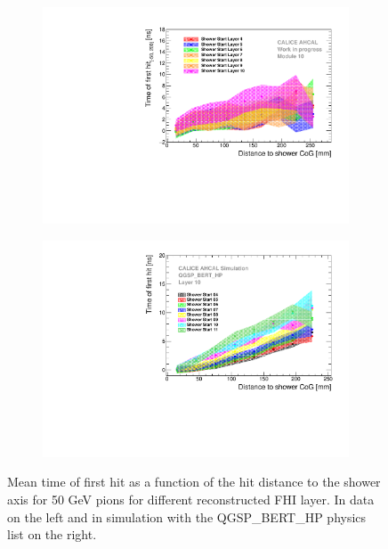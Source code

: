 \begin{figure}[htbp!]
	\begin{subfigure}[t]{0.5\textwidth}
		\centering
		\includegraphics[width=1\textwidth]{../Thesis_Plots/Timing/Pions/Plots/Timing_Radius_Comparison_ShortAsymRange_ShowerStart_FixedModule.pdf}
		\caption{}\label{fig:Radius_FHI_Fixed}
	\end{subfigure}
	\hfill
	\begin{subfigure}[t]{0.5\textwidth}
		\centering
		\includegraphics[width=1\textwidth]{../Thesis_Plots/Timing/Pions/Plots/Radius_ShowerStartTruth_FixedModule.pdf}
		\caption{}\label{fig:Radius_FHI_FixedSim}
	\end{subfigure}
	\caption{Mean time of first hit as a function of the hit distance to the shower axis for 50 GeV pions for different reconstructed FHI layer. In data on the left and in simulation with the QGSP\_BERT\_HP physics list on the right.}
	\label{fig:Radius_FHISim}
\end{figure}

